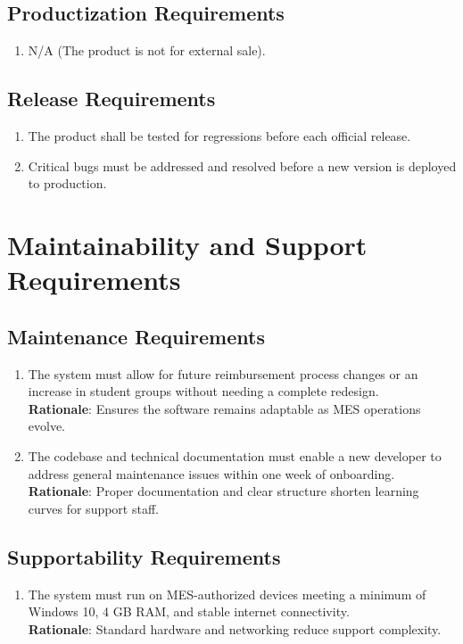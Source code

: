 \documentclass[12pt]{article}
\begin{document}
\subsection{Productization Requirements}
\begin{enumerate}
  \item N/A (The product is not for external sale).
\end{enumerate}

\subsection{Release Requirements}
\begin{enumerate}
  \item The product shall be tested for regressions before each official release. 
  \item Critical bugs must be addressed and resolved before a new version is deployed to production.
\end{enumerate}

\section{Maintainability and Support Requirements}
\subsection{Maintenance Requirements}
\begin{enumerate}
  \item The system must allow for future reimbursement process changes or an increase in student groups without needing a complete redesign. \\
  \textbf{Rationale}: Ensures the software remains adaptable as MES operations evolve.
  \item The codebase and technical documentation must enable a new developer to address general maintenance issues within one week of onboarding. \\
  \textbf{Rationale}: Proper documentation and clear structure shorten learning curves for support staff.
\end{enumerate}

\subsection{Supportability Requirements}
\begin{enumerate}
  \item The system must run on MES-authorized devices meeting a minimum of Windows 10, 4 GB RAM, and stable internet connectivity. \\
  \textbf{Rationale}: Standard hardware and networking reduce support complexity.
\end{enumerate}
\end{document}
